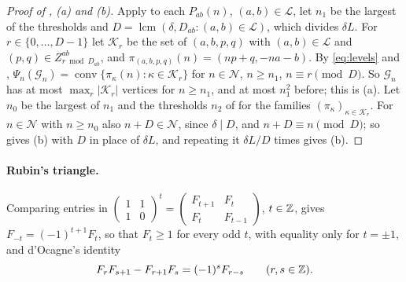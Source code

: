 \begin{proof}[Proof of , (a) and (b)]
Apply  to each $P_{ab}(n)$, $(a,b)\in\mathcal L$, let $n_1$ be the largest of the thresholds and $D=\operatorname{lcm}(\delta,D_{ab}:(a,b)\in\mathcal L)$, which divides $\delta L$.
For $r\in\{0,\dots,D-1\}$ let $\mathcal K_r$ be the set of $(a,b,p,q)$ with $(a,b)\in\mathcal L$ and $(p,q)\in Z^{ab}_{r\bmod D_{ab}}$, and $\pi_{(a,b,p,q)}(n)=(np+q,-na-b)$.
By \eqref{eq:levels} and , $\Psi_n(\mathcal G_n)=\operatorname{conv}\{\pi_\kappa(n):\kappa\in\mathcal K_r\}$ for $n\in\mathcal N$, $n\ge n_1$, $n\equiv r\pmod D$.
So $\mathcal G_n$ has at most $\max_r|\mathcal K_r|$ vertices for $n\ge n_1$, and at most $n_1^2$ before; this is (a).
Let $n_0$ be the largest of $n_1$ and the thresholds $n_2$ of  for the families $(\pi_\kappa)_{\kappa\in\mathcal K_r}$.
For $n\in\mathcal N$ with $n\ge n_0$ also $n+D\in\mathcal N$, since $\delta\mid D$, and $n+D\equiv n\pmod D$; so  gives (b) with $D$ in place of $\delta L$, and repeating it $\delta L/D$ times gives (b).
\end{proof}

\paragraph{Rubin's triangle.}
Comparing entries in $\begin{pmatrix}1&1\\1&0\end{pmatrix}^t=\begin{pmatrix}F_{t+1}&F_t\\F_t&F_{t-1}\end{pmatrix}$, $t\in\mathbb{Z}$, gives $F_{-t}=(-1)^{t+1}F_t$, so that $F_t\ge1$ for every odd $t$, with equality only for $t=\pm1$, and d'Ocagne's identity
\begin{equation}
\label{eq:docagne}
F_rF_{s+1}-F_{r+1}F_s=(-1)^sF_{r-s}\qquad(r,s\in\mathbb{Z}).
\end{equation}

